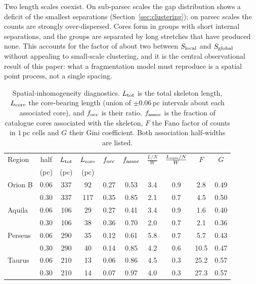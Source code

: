 \documentclass[usenatbib,twoside,twocolumn]{mnras}
\begin{document}
Two length scales coexist. On sub-parsec scales the gap distribution shows a deficit of the smallest separations (Section~\ref{sec:clustering}); on parsec scales the counts are strongly over-dispersed. Cores form in groups with short internal separations, and the groups are separated by long stretches that have produced none. This accounts for the factor of about two between $S_{\rm local}$ and $S_{\rm global}$ without appealing to small-scale clustering, and it is the central observational result of this paper: what a fragmentation model must reproduce is a spatial point process, not a single spacing.

\begin{table}
\caption{Spatial-inhomogeneity diagnostics. $L_{\rm tot}$ is the total skeleton length, $L_{\rm core}$ the core-bearing length (union of $\pm0.06$\,pc intervals about each associated core), and $f_{\rm occ}$ is their ratio. $f_{\rm assoc}$ is the fraction of catalogue cores associated with the skeleton, $F$ the Fano factor of counts in $1$\,pc cells and $G$ their Gini coefficient. Both association half-widths are listed. }
\label{tab:intermittency}
\footnotesize
\setlength{\tabcolsep}{3pt}
\begin{tabular}{lccccccccc}
\toprule
Region & half & $L_{\rm tot}$ & $L_{\rm core}$ & $f_{\rm occ}$ & $f_{\rm assoc}$ & $\frac{L/N}{W}$ & $\frac{L_{\rm core}/N}{W}$ & $F$ & $G$ \\
       & (pc) & (pc) & (pc) & & & & & & \\
\midrule
Orion B & 0.06 & 337 & 92 & 0.27 & 0.53 & 3.4 & 0.9 & 2.8 & 0.49 \\
        & 0.30 & 337 & 117 & 0.35 & 0.85 & 2.1 & 0.7 & 4.5 & 0.50 \\
Aquila  & 0.06 & 106 & 29 & 0.27 & 0.41 & 3.4 & 0.9 & 1.6 & 0.40 \\
        & 0.30 & 106 & 38 & 0.36 & 0.70 & 2.0 & 0.7 & 2.1 & 0.36 \\
Perseus & 0.06 & 290 & 35 & 0.12 & 0.61 & 5.8 & 0.7 & 5.7 & 0.43 \\
        & 0.30 & 290 & 40 & 0.14 & 0.85 & 4.2 & 0.6 & 10.5 & 0.47 \\
Taurus  & 0.06 & 210 & 13 & 0.06 & 0.86 & 4.5 & 0.3 & 25.2 & 0.57 \\
        & 0.30 & 210 & 14 & 0.07 & 0.97 & 4.0 & 0.3 & 27.3 & 0.57 \\
\bottomrule
\end{tabular}
\end{table}
\end{document}
